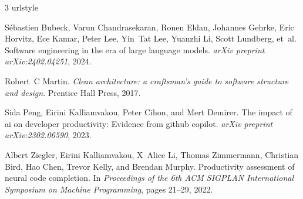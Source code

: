 \documentclass[11pt,a4paper]{article}
\begin{document}

\begin{thebibliography}{3}
\providecommand{\natexlab}[1]{#1}
\providecommand{\url}[1]{\texttt{#1}}
\expandafter\ifx\csname urlstyle\endcsname\relax
  \providecommand{\doi}[1]{doi: #1}\else
  \providecommand{\doi}{doi: \begingroup \urlstyle{rm}\Url}\fi

S{\'e}bastien Bubeck, Varun Chandrasekaran, Ronen Eldan, Johannes Gehrke, Eric Horvitz, Ece Kamar, Peter Lee, Yin~Tat Lee, Yuanzhi Li, Scott Lundberg, et~al.
\newblock Software engineering in the era of large language models.
\newblock \emph{arXiv preprint arXiv:2402.04251}, 2024.

Robert~C Martin.
\newblock \emph{Clean architecture: a craftsman's guide to software structure and design}.
\newblock Prentice Hall Press, 2017.

Sida Peng, Eirini Kalliamvakou, Peter Cihon, and Mert Demirer.
\newblock The impact of ai on developer productivity: Evidence from github copilot.
\newblock \emph{arXiv preprint arXiv:2302.06590}, 2023.

Albert Ziegler, Eirini Kalliamvakou, X~Alice Li, Thomas Zimmermann, Christian Bird, Hao Chen, Trevor Kelly, and Brendan Murphy.
\newblock Productivity assessment of neural code completion.
\newblock In \emph{Proceedings of the 6th ACM SIGPLAN International Symposium on Machine Programming}, pages 21--29, 2022.

\end{thebibliography}
\end{document}
